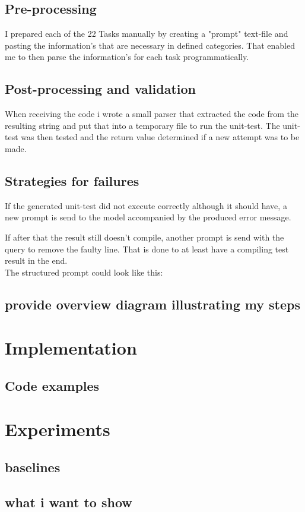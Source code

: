 \documentclass[a4paper,11pt,oneside]{memoir}
\begin{document}
\section{Pre-processing}
I prepared each of the 22 Tasks manually by creating a "prompt" text-file and pasting the information's that are necessary in defined categories. That enabled me to then parse the information's for each task programmatically.
\section{Post-processing and validation}
When receiving the code i wrote a small parser that extracted the code from the resulting string and put that into a temporary file to run the unit-test.
The unit-test was then tested and the return value determined if a new attempt was to be made.
\section{Strategies for failures}
If the generated unit-test did not execute correctly although it should have, a new prompt is send to the model accompanied by the produced error message. 

If after that the result still doesn't compile, another prompt is send with the query to remove the faulty line. That is done to at least have a compiling test result in the end.
\\The structured prompt could look like this:


\section{provide overview diagram illustrating my steps}

\chapter{Implementation}
\section{ Code examples}

\chapter{Experiments}
\section{baselines}
\section{what i want to show}
\end{document}
